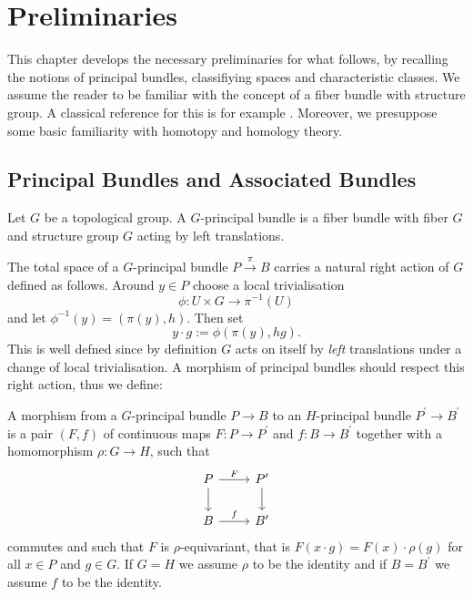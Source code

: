 \section{Preliminaries}
\label{sec:bundles}

This chapter develops the necessary preliminaries for what follows, by recalling the notions of principal bundles, classifiying spaces and characteristic classes. We assume the reader to be familiar with the concept of a fiber bundle with structure group. A classical reference for this is for example \cite{steenrod1951topology}. Moreover, we presuppose some basic familiarity with homotopy and homology theory.

\subsection{Principal Bundles and Associated Bundles}
\label{subsec:principal_bundles}

\begin{definition}
    \label{bundles:def:principal_bundle}
    Let $G$ be a topological group. A $G$-principal bundle is a fiber bundle with fiber $G$ and structure group $G$ acting by left translations.
\end{definition}

The total space of a $G$-principal bundle $P \xrightarrow{\pi} B$ carries a natural right action of $G$ defined as follows. Around $y \in P$ choose a local trivialisation
\[
\phi \colon U \times G \to \pi^{-1}(U)
\]
and let $\phi^{-1}(y) = (\pi(y),h)$. Then set 
\[
y \cdot g := \phi(\pi(y),hg).
\]
This is well defned since by definition $G$ acts on itself by \textit{left} translations under a change of local trivialisation. 
A morphism of principal bundles should respect this right action, thus we define:

\begin{definition}
    \label{bundles:def:principal_bundles_morphism}
    A morphism from a $G$-principal bundle $P \to B$ to an $H$-principal bundle $P^\prime \to B^\prime$ is a pair $(F,f)$ of continuous maps $F \colon P \to P^\prime$ and $f \colon B \to B^\prime$ together with a homomorphism $\rho \colon G \to H$, such that 
    \[\begin{tikzcd}
	P & {P^\prime} \\
	B & {B^\prime}
	\arrow["F", from=1-1, to=1-2]
	\arrow[from=1-1, to=2-1]
	\arrow[from=1-2, to=2-2]
	\arrow["f", from=2-1, to=2-2]
    \end{tikzcd}\]
    commutes and such that $F$ is $\rho$-equivariant, that is $F(x \cdot g) = F(x) \cdot \rho(g)$ for all $x \in P$ and $g \in G$. If $G=H$ we assume $\rho$ to be the identity and if $B = B^\prime$ we assume $f$ to be the identity.
\end{definition}

